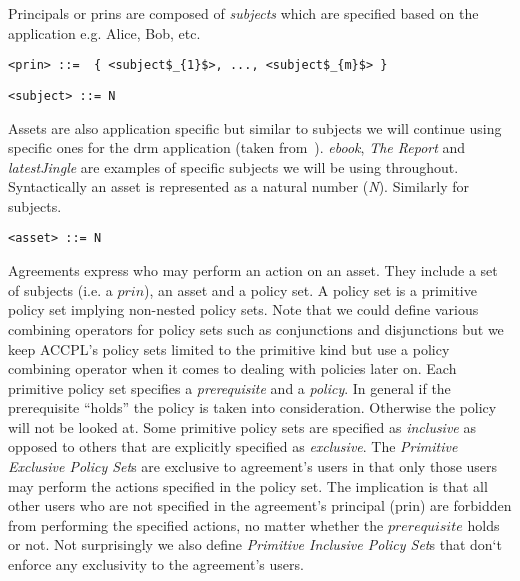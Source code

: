 Principals or prins are composed of \emph{subjects} which are specified based on the application e.g. Alice, Bob, etc.

\lstset{mathescape, language=AST}  
\begin{lstlisting}[frame=single, caption={prin},label={lst:prinast}]
<prin> ::=  { <subject$_{1}$>, ..., <subject$_{m}$> }
\end{lstlisting}

\lstset{mathescape, language=AST}  
\begin{lstlisting}[frame=single, caption={subject},label={lst:subjectast}]
<subject> ::= N
\end{lstlisting}

Assets are also application specific but similar to subjects we will continue using specific ones for the \ac{drm} application (taken from~\cite{pucella2006}). \emph{ebook}, \emph{The Report} and \emph{latestJingle} are examples of specific subjects we will be using throughout. Syntactically an asset is represented as a natural number (\emph{N}). Similarly for subjects.

\lstset{mathescape, language=AST}  
\begin{lstlisting}[frame=single, caption={asset},label={lst:assetast}]
<asset> ::= N
\end{lstlisting}

Agreements express who may perform an action on an asset. They include a set of subjects (i.e. a $prin$), an asset and a policy set. A policy set is a primitive policy set implying non-nested policy sets. Note that we could define various combining operators for policy sets such as conjunctions and disjunctions but we keep \ac{ACCPL}'s policy sets limited to the primitive kind but use a policy combining operator when it comes to dealing with policies later on. Each primitive policy set specifies a \emph{prerequisite} and a \emph{policy}. In general if the prerequisite ``holds'' the policy is taken into consideration. Otherwise the policy will not be looked at. Some primitive policy sets are specified as \emph{inclusive} as opposed to others that are explicitly specified as \emph{exclusive}. The \emph{Primitive Exclusive Policy Set}s are exclusive to agreement's users in that only those users may perform the actions specified in the policy set. The implication is that all other users who are not specified in the agreement's principal (prin) are forbidden from performing the specified actions, no matter whether the $prerequisite$ holds or not. Not surprisingly we also define \emph{Primitive Inclusive Policy Set}s that don`t enforce any exclusivity to the agreement's users.


